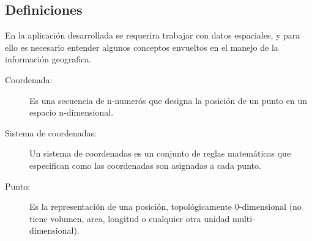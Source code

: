   \subsection{Definiciones} %
  \label{sub:definiciones}

    En la aplicaci\'on desarrollada se requerira trabajar con datos espaciales, y para ello es necesario entender algunos conceptos envueltos en el manejo de la informaci\'on geografica.

    \begin{description}
      \item[Coordenada:] Es una secuencia de n-numer\'os que designa la posici\'on de un punto en un espacio n-dimensional. \\
      \item[Sistema de coordenadas:] Un sistema de coordenadas es  un conjunto de reglas matemáticas que especifican como las coordenadas son asignadas  a cada  punto.
      \item[Punto:] Es  la representaci\'on de una posici\'on, topol\'ogicamente 0-dimensional (no tiene volumen, area, longitud o cualquier otra unidad multi-\\dimensional).
    \end{description}





